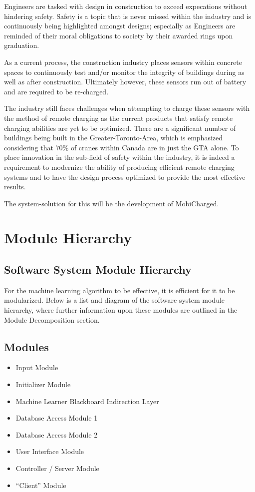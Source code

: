 \documentclass[12pt, titlepage]{article}
\begin{document}
Engineers are tasked with design in construction to exceed expecations without hindering safety. Safety is a topic that is never missed within the industry and is continuously being highlighted amongst designs; especially as Engineers are reminded of their moral obligations to society by their awarded rings upon graduation. 
\par
As a current process, the construction industry places sensors within concrete spaces to continuously test and/or monitor the integrity of buildings during as well as after construction. Ultimately however, these sensors run out of battery and are required to be re-charged.
\par
The industry still faces challenges when attempting to charge these sensors with the method of remote charging as the current products that satisfy remote charging abilities are yet to be optimized. There are a significant number of buildings being built in the Greater-Toronto-Area, which is emphasized considering that 70\% of cranes within Canada are in just the GTA alone. To place innovation in the sub-field of safety within the industry, it is indeed a requirement to modernize the ability of producing efficient remote charging systems and to have the design process optimized to provide the most effective results.
\par
The system-solution for this will be the development of MobiCharged. 



\section{Module Hierarchy}
\subsection{Software System Module Hierarchy}
For the machine learning algorithm to be effective, it is efficient for it to be modularized. Below is a list and diagram of the software system module hierarchy, where further information upon these modules are outlined in the Module Decomposition section.

\subsection{Modules}
\begin{itemize}
  \item Input Module
  \item Initializer Module
  \item Machine Learner Blackboard Indirection Layer
  \item Database Access Module 1
  \item Database Access Module 2
  \item User Interface Module
  \item Controller / Server Module
  \item “Client” Module
\end{itemize}
\end{document}
